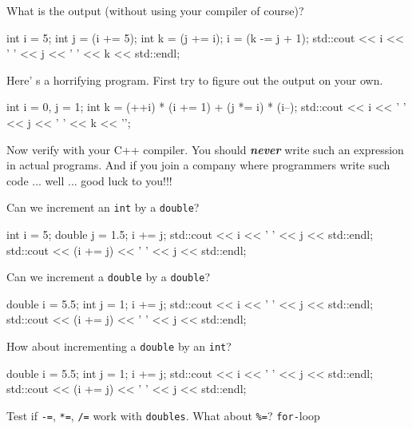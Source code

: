 \begin{ex}
What is the output (without using your compiler of course)?
\begin{console}
int i = 5;
int j = (i += 5);
int k = (j += i);
i = (k -= j + 1);
std::cout << i << ' ' << j << ' ' << k << std::endl;
\end{console}
\end{ex}

\begin{ex}
 Here' s a horrifying program. First
try to figure out the output on your own.
\begin{console}
int i = 0, j = 1;
int k = (++i) * (i += 1) + (j *= i) * (i--);
std::cout << i << ' ' << j << ' ' << k << '\n';
\end{console}
\end{ex}
Now verify with your C++ compiler. You should \emph{\textbf{never}} write such an expression in actual programs. And if you join a company where programmers write such code ... well ... good luck to you!!!

\begin{ex}
Can we increment an \texttt{int} by a \texttt{double}?
\begin{console}
int i = 5;
double j = 1.5;
i += j;
std::cout << i << ' ' << j << std::endl;
std::cout << (i += j) << ' ' << j << std::endl;
\end{console}
\end{ex}

\begin{ex}
Can we increment a \texttt{double} by a \texttt{double}?
\begin{console}
double i = 5.5;
int j = 1;
i += j;
std::cout << i << ' ' << j << std::endl;
std::cout << (i += j) << ' ' << j << std::endl;
\end{console}
\end{ex}

\begin{ex}
How about incrementing a \texttt{double} by an
\texttt{int}?
\begin{console}
double i = 5.5;
int j = 1;
i += j;
std::cout << i << ' ' << j << std::endl;
std::cout << (i += j) << ' ' << j << std::endl;
\end{console}
\end{ex}

\begin{ex}
 Test if \texttt{-=}, \texttt{*=}, \texttt{/=} work with
\texttt{doubles}. What about \texttt{\%=}? \texttt{for-}loop
\end{ex}

